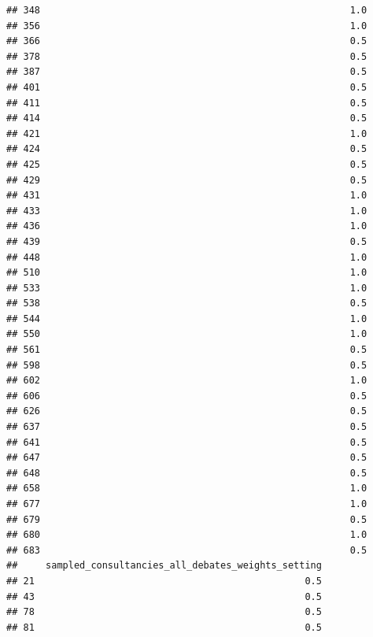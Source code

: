 \documentclass[
]{article}
\begin{document}
\begin{verbatim}
## 348                                                       1.0
## 356                                                       1.0
## 366                                                       0.5
## 378                                                       0.5
## 387                                                       0.5
## 401                                                       0.5
## 411                                                       0.5
## 414                                                       0.5
## 421                                                       1.0
## 424                                                       0.5
## 425                                                       0.5
## 429                                                       0.5
## 431                                                       1.0
## 433                                                       1.0
## 436                                                       1.0
## 439                                                       0.5
## 448                                                       1.0
## 510                                                       1.0
## 533                                                       1.0
## 538                                                       0.5
## 544                                                       1.0
## 550                                                       1.0
## 561                                                       0.5
## 598                                                       0.5
## 602                                                       1.0
## 606                                                       0.5
## 626                                                       0.5
## 637                                                       0.5
## 641                                                       0.5
## 647                                                       0.5
## 648                                                       0.5
## 658                                                       1.0
## 677                                                       1.0
## 679                                                       0.5
## 680                                                       1.0
## 683                                                       0.5
##     sampled_consultancies_all_debates_weights_setting
## 21                                                0.5
## 43                                                0.5
## 78                                                0.5
## 81                                                0.5

\end{verbatim}
\end{document}
